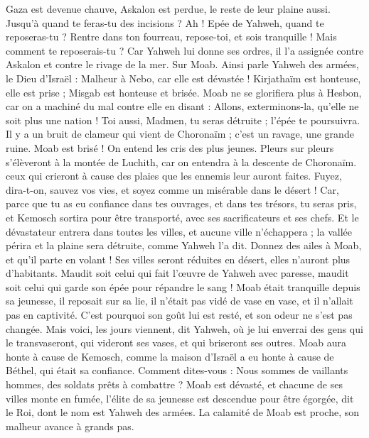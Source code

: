 \begin{multicols}{2}
Gaza est devenue chauve, Askalon est perdue, le reste de leur plaine aussi. Jusqu'à quand te feras-tu des incisions ?
Ah ! Epée de Yahweh, quand te reposeras-tu ? Rentre dans ton fourreau, repose-toi, et sois tranquille !
Mais comment te reposerais-tu ? Car Yahweh lui donne ses ordres, il l'a assignée contre Askalon et contre le rivage de la mer.
\VerseOne{}Sur Moab. Ainsi parle Yahweh des armées, le Dieu d'Israël : Malheur à Nebo, car elle est dévastée ! Kirjathaïm est honteuse, elle est prise ; Misgab est honteuse et brisée.
Moab ne se glorifiera plus à Hesbon, car on a machiné du mal contre elle en disant : Allons, exterminons-la, qu'elle ne soit plus une nation ! Toi aussi, Madmen, tu seras détruite ; l'épée te poursuivra.
Il y a un bruit de clameur qui vient de Choronaïm ; c'est un ravage, une grande ruine.
Moab est brisé ! On entend les cris des plus jeunes.
Pleurs sur pleurs s’élèveront à la montée de Luchith, car on entendra à la descente de Choronaïm. ceux qui crieront à cause des plaies que les ennemis leur auront faites.
Fuyez, dira-t-on, sauvez vos vies, et soyez comme un misérable dans le désert !
Car, parce que tu as eu confiance dans tes ouvrages, et dans tes trésors, tu seras pris, et Kemosch sortira pour être transporté, avec ses sacrificateurs et ses chefs.
Et le dévastateur entrera dans toutes les villes, et aucune ville n'échappera ; la vallée périra et la plaine sera détruite, comme Yahweh l'a dit.
Donnez des ailes à Moab, et qu'il parte en volant ! Ses villes seront réduites en désert, elles n'auront plus d'habitants.
Maudit soit celui qui fait l'œuvre de Yahweh avec paresse, maudit soit celui qui garde son épée pour répandre le sang !
Moab était tranquille depuis sa jeunesse, il reposait sur sa lie, il n'était pas vidé de vase en vase, et il n'allait pas en captivité. C'est pourquoi son goût lui est resté, et son odeur ne s'est pas changée.
Mais voici, les jours viennent, dit Yahweh, où je lui enverrai des gens qui le transvaseront, qui videront ses vases, et qui briseront ses outres.
Moab aura honte à cause de Kemosch, comme la maison d'Israël a eu honte à cause de Béthel, qui était sa confiance.
Comment dites-vous : Nous sommes de vaillants hommes, des soldats prêts à combattre ?
Moab est dévasté, et chacune de ses villes monte en fumée, l'élite de sa jeunesse est descendue pour être égorgée, dit le Roi, dont le nom est Yahweh des armées.
La calamité de Moab est proche, son malheur avance à grands pas.

\end{multicols}
